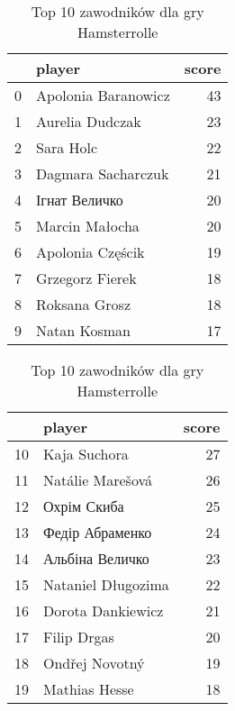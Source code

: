 
\begin{table}[h]
\begin{minipage}{.5\linewidth}
\caption{Top 10 zawodników dla gry Indian Summer}\label{tab:top10_1}
\centering
\begin{tabular}{rlr}
\hline
    & player              &   score \\
\hline
  0 & Apolonia Baranowicz &      43 \\
  1 & Aurelia Dudczak     &      23 \\
  2 & Sara Holc           &      22 \\
  3 & Dagmara Sacharczuk  &      21 \\
  4 & Ігнат Величко       &      20 \\
  5 & Marcin Małocha      &      20 \\
  6 & Apolonia Częścik    &      19 \\
  7 & Grzegorz Fierek     &      18 \\
  8 & Roksana Grosz       &      18 \\
  9 & Natan Kosman        &      17 \\
\hline
\end{tabular}
\end{minipage}%
\begin{minipage}{.5\linewidth}
\centering
\caption{Top 10 zawodników dla gry Hamsterrolle}\label{tab:top10_2}
\begin{tabular}{rlr}
\hline
    & player             &   score \\
\hline
 10 & Kaja Suchora       &      27 \\
 11 & Natálie Marešová   &      26 \\
 12 & Охрім Скиба        &      25 \\
 13 & Федір Абраменко    &      24 \\
 14 & Альбіна Величко    &      23 \\
 15 & Nataniel Długozima &      22 \\
 16 & Dorota Dankiewicz  &      21 \\
 17 & Filip Drgas        &      20 \\
 18 & Ondřej Novotný     &      19 \\
 19 & Mathias Hesse      &      18 \\
\hline
\end{tabular}
\end{minipage}%
\end{table}
